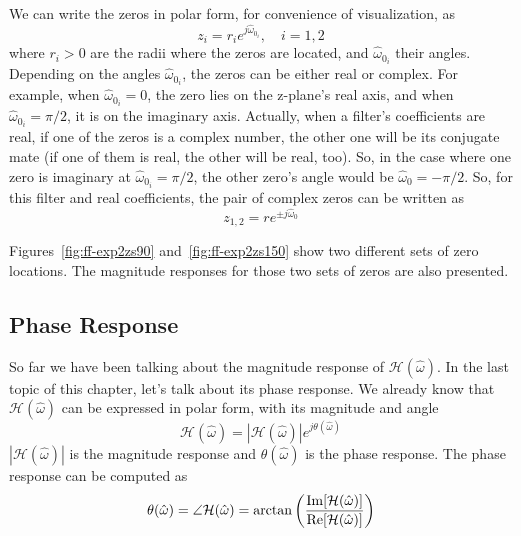 %

We can write the zeros in polar form, for convenience of
visualization, as
\begin{equation}
z_{i}=r_i e^{j \hat{\omega}_{0_i}}, \quad i=1,2
\end{equation}
where $r_i>0$ are the radii where the zeros are located, and
$\hat{\omega}_{0_i}$ their angles.  Depending on the angles
$\hat{\omega}_{0_i}$, the zeros can be either real or complex. For
example, when $\hat{\omega}_{0_i}=0$, the zero lies on the z-plane's
real axis, and when $\hat{\omega}_{0_i}=\pi/2$, it is on the imaginary
axis. Actually, when a filter's coefficients are real, if one of the
zeros is a complex number, the other one will be its conjugate mate
(if one of them is real, the other will be real, too).  So, in the
case where one zero is imaginary at $\hat{\omega}_{0_i}=\pi/2$, the
other zero's angle would be $\hat{\omega}_0=-\pi/2$. So, for this
filter and real coefficients, the pair of complex zeros can be written
as
\begin{equation}
z_{1,2}=r e^{\pm j \hat{\omega}_0}
\label{eq:ff-zero}
\end{equation}

Figures~\ref{fig:ff-exp2zs90} and~\ref{fig:ff-exp2zs150} show two
different sets of zero locations. The magnitude responses for
those two sets of zeros are also presented.

\subsection{Phase Response}

So far we have been talking about the magnitude response of
$\mathcal{H}(\hat{\omega})$.  In the last topic of this chapter, let's
talk about its phase response. We already know that
$\mathcal{H}(\hat{\omega})$ can be expressed in polar form, with its
magnitude and angle
\begin{equation}
\mathcal{H}(\hat{\omega})=|\mathcal{H}(\hat{\omega})|e^{j \theta(\hat{\omega})}
\end{equation}
$|\mathcal{H}(\hat{\omega})|$ is the magnitude response and
$\theta(\hat{\omega})$ is the phase response. The phase response can
be computed as
\begin{equation}
\theta(\hat{\omega}) = \angle\mathcal{H}(\hat{\omega})
 = \arctan\left(\frac{\operatorname{Im}[\mathcal{H}(\hat{\omega})]}{\operatorname{Re}[\mathcal{H}(\hat{\omega})]}\right)
\label{eq:compute-phase-resp}
\end{equation}


